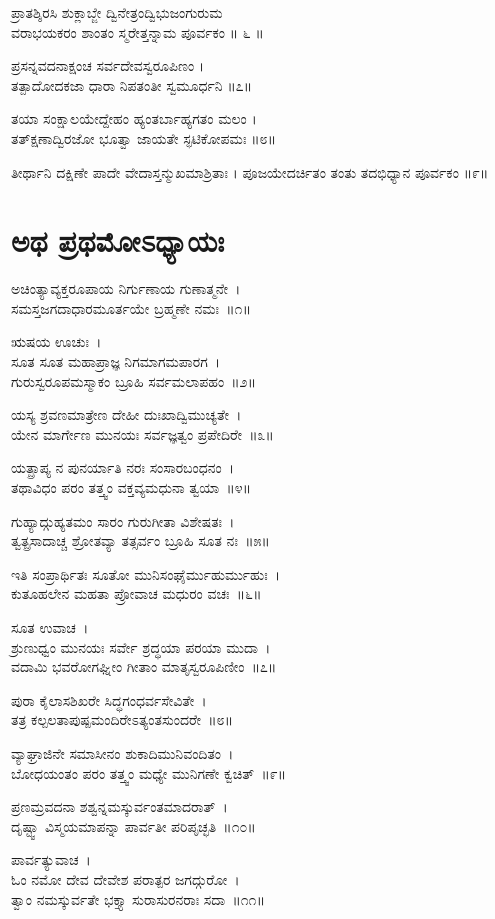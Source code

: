 ಪ್ರಾತಶ್ಶಿರಸಿ ಶುಕ್ಲಾಬ್ಜೇ ದ್ವಿನೇತ್ರಂದ್ವಿಭುಜಂಗುರುಮ\\
ವರಾಭಯಕರಂ ಶಾಂತಂ ಸ್ಮರೇತ್ತನ್ನಾಮ ಪೂರ್ವಕಂ ॥ ೬ ॥

ಪ್ರಸನ್ನವದನಾಕ್ಷಂಚ ಸರ್ವದೇವಸ್ವರೂಪಿಣಂ ।\\
ತತ್ಪಾದೋದಕಜಾ ಧಾರಾ ನಿಪತಂತೀ ಸ್ವಮೂರ್ಧನಿ ॥೭॥

ತಯಾ ಸಂಕ್ಷಾಲಯೇದ್ದೇಹಂ ಹ್ಯಂತರ್ಬಾಹ್ಯಗತಂ ಮಲಂ ।\\
ತತ್ಕ್ಷಣಾದ್ವಿರಜೋ ಭೂತ್ವಾ ಜಾಯತೇ ಸ್ಫಟಿಕೋಪಮಃ ॥೮॥

ತೀರ್ಥಾನಿ ದಕ್ಷಿಣೇ ಪಾದೇ ವೇದಾಸ್ತನ್ಮುಖಮಾಶ್ರಿತಾಃ ।
ಪೂಜಯೇದರ್ಚಿತಂ ತಂತು ತದಭಿಧ್ಯಾನ ಪೂರ್ವಕಂ ॥೯॥

\section{ಅಥ ಪ್ರಥಮೋಽಧ್ಯಾಯಃ}
ಅಚಿಂತ್ಯಾವ್ಯಕ್ತರೂಪಾಯ ನಿರ್ಗುಣಾಯ ಗುಣಾತ್ಮನೇ~।\\
ಸಮಸ್ತಜಗದಾಧಾರಮೂರ್ತಯೇ ಬ್ರಹ್ಮಣೇ ನಮಃ~॥೧॥

ಋಷಯ ಊಚುಃ~।\\
ಸೂತ ಸೂತ ಮಹಾಪ್ರಾಜ್ಞ ನಿಗಮಾಗಮಪಾರಗ~।\\
ಗುರುಸ್ವರೂಪಮಸ್ಮಾಕಂ ಬ್ರೂಹಿ ಸರ್ವಮಲಾಪಹಂ~॥೨॥

ಯಸ್ಯ ಶ್ರವಣಮಾತ್ರೇಣ ದೇಹೀ ದುಃಖಾದ್ವಿಮುಚ್ಯತೇ~।\\
ಯೇನ ಮಾರ್ಗೇಣ ಮುನಯಃ ಸರ್ವಜ್ಞತ್ವಂ ಪ್ರಪೇದಿರೇ~॥೩॥

ಯತ್ಪ್ರಾಪ್ಯ ನ ಪುನರ್ಯಾತಿ ನರಃ ಸಂಸಾರಬಂಧನಂ~।\\
ತಥಾವಿಧಂ ಪರಂ ತತ್ತ್ವಂ ವಕ್ತವ್ಯಮಧುನಾ ತ್ವಯಾ~॥೪॥

ಗುಹ್ಯಾದ್ಗುಹ್ಯತಮಂ ಸಾರಂ ಗುರುಗೀತಾ ವಿಶೇಷತಃ~।\\
ತ್ವತ್ಪ್ರಸಾದಾಚ್ಚ ಶ್ರೋತವ್ಯಾ ತತ್ಸರ್ವಂ ಬ್ರೂಹಿ ಸೂತ ನಃ~॥೫॥

ಇತಿ ಸಂಪ್ರಾರ್ಥಿತಃ ಸೂತೋ ಮುನಿಸಂಘೈರ್ಮುಹುರ್ಮುಹುಃ~।\\
ಕುತೂಹಲೇನ ಮಹತಾ ಪ್ರೋವಾಚ ಮಧುರಂ ವಚಃ~॥೬॥

ಸೂತ ಉವಾಚ~।\\
ಶ್ರುಣುಧ್ವಂ ಮುನಯಃ ಸರ್ವೇ ಶ್ರದ್ಧಯಾ ಪರಯಾ ಮುದಾ~।\\
ವದಾಮಿ ಭವರೋಗಘ್ನೀಂ ಗೀತಾಂ ಮಾತೃಸ್ವರೂಪಿಣೀಂ~॥೭॥

ಪುರಾ ಕೈಲಾಸಶಿಖರೇ ಸಿದ್ಧಗಂಧರ್ವಸೇವಿತೇ~।\\
ತತ್ರ ಕಲ್ಪಲತಾಪುಷ್ಪಮಂದಿರೇಽತ್ಯಂತಸುಂದರೇ~॥೮॥

ವ್ಯಾಘ್ರಾಜಿನೇ ಸಮಾಸೀನಂ ಶುಕಾದಿಮುನಿವಂದಿತಂ~।\\
ಬೋಧಯಂತಂ ಪರಂ ತತ್ತ್ವಂ ಮಧ್ಯೇ ಮುನಿಗಣೇ ಕ್ವಚಿತ್~॥೯॥

ಪ್ರಣಮ್ರವದನಾ ಶಶ್ವನ್ನಮಸ್ಕುರ್ವಂತಮಾದರಾತ್~।\\
ದೃಷ್ಟ್ವಾ ವಿಸ್ಮಯಮಾಪನ್ನಾ ಪಾರ್ವತೀ ಪರಿಪೃಚ್ಛತಿ~॥೧೦॥

ಪಾರ್ವತ್ಯುವಾಚ~।\\
ಓಂ ನಮೋ ದೇವ ದೇವೇಶ ಪರಾತ್ಪರ ಜಗದ್ಗುರೋ~।\\
ತ್ವಾಂ ನಮಸ್ಕುರ್ವತೇ ಭಕ್ತ್ಯಾ ಸುರಾಸುರನರಾಃ ಸದಾ~॥೧೧॥

